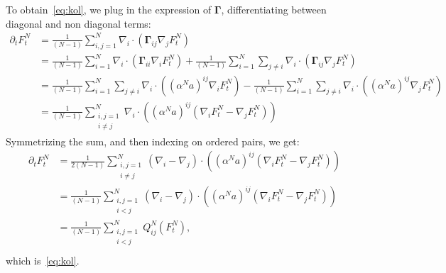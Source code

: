 \documentclass[11pt,a4paper]{article}
\theoremstyle{definition}
\theoremstyle{plain}
\newcommand{\bd}[1]{\mathbf{#1}}
\begin{document}
To obtain~\eqref{eq:kol}, we plug in the expression of $\bd{\Gamma}$, differentiating between diagonal and non diagonal terms:
\begin{align*}
    \partial_t F^N_t &= \frac{1}{(N-1)} \sum_{i,j=1}^{N} \nabla_i \cdot (\bd{\Gamma}_{ij} \nabla_j F^N_t) \\
    &= \frac{1}{(N-1)} \sum_{i=1}^{N} \nabla_i \cdot (\bd{\Gamma}_{ii} \nabla_i F^N_t) + \frac{1}{(N-1)} \sum_{i=1}^{N}\sum_{j \neq i} \nabla_i \cdot (\bd{\Gamma}_{ij} \nabla_j F^N_t) \\
    &= \frac{1}{(N-1)} \sum_{i=1}^{N} \sum_{j \neq i} \nabla_i\cdot  ((\alpha^Na)^{ij} \nabla_i F^N_t) - \frac{1}{(N-1)} \sum_{i=1}^{N}\sum_{j \neq i} \nabla_i\cdot  ((\alpha^Na)^{ij} \nabla_j F^N_t) \\
    &= \frac{1}{(N-1)} \sum_{\substack{i, j = 1 \\ i\neq j}}^N \nabla_i \cdot ((\alpha^Na)^{ij} (\nabla_i F^N_t - \nabla_j F^N_t))
\end{align*}
Symmetrizing the sum, and then indexing on ordered pairs, we get:
\begin{align*}
    \partial_t F^N_t &=\frac{1}{2(N-1)} \sum_{\substack{i, j = 1 \\ i\neq j}}^N (\nabla_i - \nabla_j)\cdot ((\alpha^Na)^{ij} (\nabla_i F^N_t - \nabla_j F^N_t)) \\
    &= \frac{1}{(N-1)} \sum_{\substack{i, j = 1 \\ i<j}}^N (\nabla_i - \nabla_j)\cdot ((\alpha^Na)^{ij} (\nabla_i F^N_t - \nabla_j F^N_t))\\
    &= \frac{1}{(N-1)} \sum_{\substack{i, j = 1 \\ i<j}}^N Q_{ij}^N (F^N_t),\\
\end{align*}
which is~\eqref{eq:kol}.

\sloppy
\printbibliography
\end{document}
